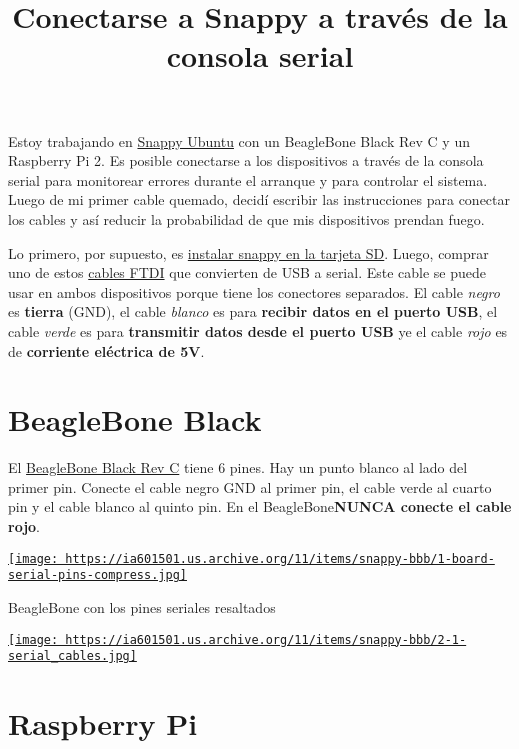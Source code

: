 \documentclass[12pt]{article}
\title{Conectarse a Snappy a través de la consola serial}
\begin{document}
Estoy trabajando en \href{https://developer.ubuntu.com/en/snappy/}
{Snappy Ubuntu} con un BeagleBone Black Rev C y un Raspberry Pi 2. Es posible
conectarse a los dispositivos a través de la consola serial para monitorear
errores durante el arranque y para controlar el sistema. Luego de mi primer
cable quemado, decidí escribir las instrucciones para conectar los cables y así
reducir la probabilidad de que mis dispositivos prendan fuego.

Lo primero, por supuesto, es
\href{https://developer.ubuntu.com/en/snappy/start/}
{instalar snappy en la tarjeta SD}. Luego, comprar uno de estos
\href{http://www.adafruit.com/products/954}{cables FTDI} que convierten de USB
a serial. Este cable se puede usar en ambos dispositivos porque tiene los
conectores separados. El cable \emph{negro} es \textbf{tierra} (GND), el cable
\emph{blanco} es para \textbf{recibir datos en el puerto USB}, el cable
\emph{verde} es para \textbf{transmitir datos desde el puerto USB} ye el cable
\emph{rojo} es de \textbf{corriente eléctrica de 5V}.

\section{BeagleBone Black}

El \href{https://www.adafruit.com/product/1876}{BeagleBone Black Rev C} tiene 6
pines. Hay un punto blanco al lado del primer pin. Conecte el cable negro GND
al primer pin, el cable verde al cuarto pin y el cable blanco al quinto pin.
En el BeagleBone\textbf{NUNCA conecte el cable rojo}.

\begin{center}
  \href{
    https://ia601501.us.archive.org/11/items/snappy-bbb/1-board-serial-pins-compress.jpg}{
    \texttt{[image: 
      https://ia601501.us.archive.org/11/items/snappy-bbb/1-board-serial-pins-compress.jpg]}
  }
  \caption{BeagleBone con los pines seriales resaltados}
\end{center}

\begin{center}
  \href{
    https://ia601501.us.archive.org/11/items/snappy-bbb/2-1-serial_cables.jpg}{
    \texttt{[image: 
      https://ia601501.us.archive.org/11/items/snappy-bbb/2-1-serial\_cables.jpg]}
  }
\end{center}

\section{Raspberry Pi}
\end{document}
